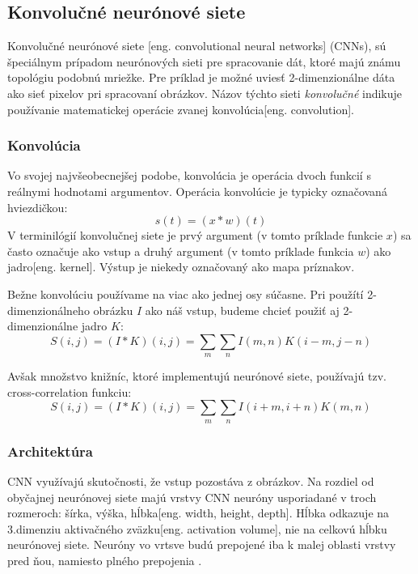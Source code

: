 \subsection{Konvolučné neurónové siete}
Konvolučné neurónové siete [eng. convolutional neural networks] (CNNs), sú špeciálnym prípadom neurónových sieti pre spracovanie
    dát, ktoré majú známu topológiu podobnú mriežke.
Pre príklad je možné uviesť 2-dimenzionálne dáta ako sieť pixelov pri spracovaní obrázkov.
Názov týchto sieti \textit{konvolučné} indikuje používanie matematickej operácie zvanej konvolúcia[eng. convolution]\cite{book:Goodfellow-et-al-2016}.

\subsubsection{Konvolúcia}
Vo svojej najvšeobecnejšej podobe, konvolúcia je operácia dvoch funkcií s reálnymi hodnotami argumentov.
Operácia konvolúcie je typicky označovaná hviezdičkou:
\begin{equation}
    s(t) = (x * w)(t)
\end{equation}
V terminilógií konvolučnej siete je prvý argument (v tomto príklade funkcie $x$) sa často označuje ako vstup a druhý
    argument (v tomto príklade funkcia $w$) ako jadro[eng. kernel]. Výstup je niekedy označovaný ako mapa príznakov.

Bežne konvolúciu používame na viac ako jednej osy súčasne.
Pri použítí 2-dimenzionálneho obrázku $I$ ako náš vstup, budeme chcieť použiť aj 2-dimenzionálne jadro $K$\cite{book:Goodfellow-et-al-2016}:
\begin{equation}
    S(i,j) = (I * K)(i, j) = \sum_m \sum_n I(m,n) K(i - m, j - n)
\end{equation}

Avšak množstvo knižníc, ktoré implementujú neurónové siete, používajú tzv. cross-correlation funkciu\cite{book:Goodfellow-et-al-2016}:
\begin{equation}
    S(i,j) = (I * K)(i, j) = \sum_m \sum_n I(i + m, i + n) K(m, n)
\end{equation}

\subsubsection{Architektúra}
CNN využívajú skutočnosti, že vstup pozostáva z obrázkov.
Na rozdiel od obyčajnej neurónovej siete majú vrstvy CNN neuróny usporiadané v troch rozmeroch: šírka, výška, hĺbka[eng. width, height, depth].
Hĺbka odkazuje na 3.dimenziu aktivačného zväzku[eng. activation volume], nie na celkovú hĺbku neurónovej siete.
Neuróny vo vrtsve budú prepojené iba k malej oblasti vrstvy pred ňou, namiesto plného prepojenia \cite{odkaz:CNNArchitecture}.

